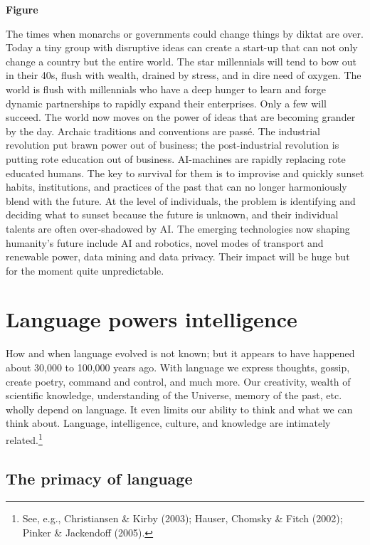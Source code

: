 \begin{multicols}{2}
\begin{center}
{\bf Figure}
\end{center}

The times when monarchs or governments could change things by diktat are over. Today a tiny group with disruptive ideas can create a start-up that can not only change a country but the entire world. The star millennials will tend to bow out in their 40s, flush with wealth, drained by stress, and in dire need of oxygen. The world is flush with millennials who have a deep hunger to learn and forge dynamic partnerships to rapidly expand their enterprises. Only a few will succeed. The world now moves on the power of ideas that are becoming grander by the day. Archaic traditions and conventions are passé. The industrial revolution put brawn power out of business; the post-industrial revolution is putting rote education out of business. AI-machines are rapidly replacing rote educated humans. The key to survival for them is to improvise and quickly sunset habits, institutions, and practices of the past that can no longer harmoniously blend with the future. At the level of individuals, the problem is identifying and deciding what to sunset because the future is unknown, and their individual talents are often over-shadowed by AI. The emerging technologies now shaping humanity's future include AI and robotics, novel modes of transport and renewable power, data mining and data privacy. Their impact will be huge but for the moment quite unpredictable.

\section{Language powers intelligence}

How and when language evolved is not known; but it appears to have happened about 30,000 to 100,000 years ago. With language we express thoughts, gossip, create poetry, command and control, and much more. Our creativity, wealth of scientific knowledge, understanding of the Universe, memory of the past, etc. wholly depend on language. It even limits our ability to think and what we can think about. Language, intelligence, culture, and knowledge are intimately related.\footnote{See, e.g., Christiansen \& Kirby (2003); Hauser, Chomsky \& Fitch (2002); Pinker \& Jackendoff (2005).}

\subsection{The primacy of language}


\end{multicols}
